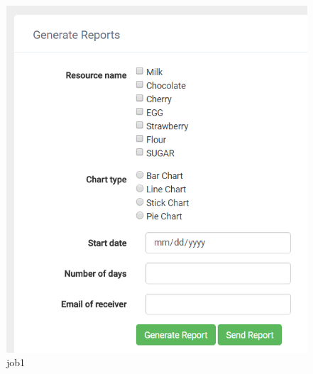 \documentclass[a4paper,11pt,twoside]{report}
\theoremstyle{definition}
\begin{document}
\begin{figure}[h!]
\begin{center}
\includegraphics[width=\textwidth]{AS/report/3}
\end{center}
\caption{job1}
\end{figure}
\thispagestyle{empty}
\end{document}
